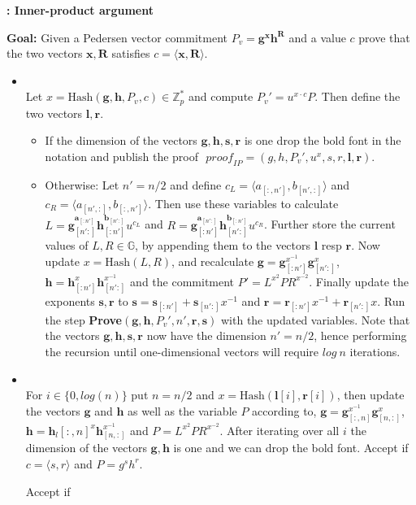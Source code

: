 \begin{algorithm}
\caption{\textbf{: Inner-product argument}}
\textbf{Goal:} Given a Pedersen vector  commitment $P_v=\bm{g}^{\bm{x}} \bm{h}^\bm{R}$ and a value $c$ prove that the two vectors $\bm{x},\bm{R}$ satisfies $c=\langle\bm{x},\bm{R}\rangle$.
\vspace{2pt}
\hline
\vspace{2pt}
\begin{itemize}
\item{}\\
Let $x=\text{Hash}(\mathbf{g},\mathbf{h},P_v,c) \in\mathds{Z}_p^*$ and compute $P_v'= u^{x\cdot c}P$. Then define the two vectors $\mathbf{l},\mathbf{r}$.
\begin{itemize}
    \item If the dimension of the vectors $\mathbf{g},\mathbf{h},\mathbf{s},\mathbf{r}$ is one drop the bold font in the notation and publish the proof $\textit{ proof}_{IP}=(g,h,P_v',u^x,s,r,\mathbf{l},\mathbf{r})$.
    \item  Otherwise:  Let $n'=n/2$ and define  $c_L=\langle a_{[:,n']},b_{[n',:]} \rangle$ and $c_R=\langle a_{[n',:]},b_{[:,n']} \rangle$. Then use these variables to calculate $L=\mathbf{g}_{[n':]}^{\mathbf{a}_{[:n']}} \mathbf{h}_{[:n']}^{\mathbf{b}_{[n':]}} u^{c_L}$ and $R=\mathbf{g}_{[:n']}^{\mathbf{a}_{[n':]}} \mathbf{h}_{[n':]}^{\mathbf{b}_{[:n']}} u^{c_R}$. Further store the current values of $L,R\in\mathds{G}$, by appending them to the vectors $\mathbf{l}$ resp $\mathbf{r}$. Now update $x=\text{Hash}(L,R)$, and recalculate $\mathbf{g} = \mathbf{g}_{[:n']}^{x^{-1}}\mathbf{g}_{[n':]}^{x}$, $\mathbf{h} = \mathbf{h}_{[:n']}^{x}\mathbf{h}_{[n':]}^{x^{-1}}$ and the commitment $P'=L^{x^2}PR^{x^{-2}}$. Finally update the exponents $\mathbf{s},\mathbf{r}$ to $\mathbf{s} = \mathbf{s}_{[:n']}+\mathbf{s}_{[n':]}x^{-1}$ and $\mathbf{r} = \mathbf{r}_{[:n']}x^{-1}+\mathbf{r}_{[n':]}x$. Run the step \textbf{Prove}$(\mathbf{g},\mathbf{h},P_v',n',\mathbf{r},\mathbf{s})$ with the updated variables. Note that the vectors $\mathbf{g},\mathbf{h},\mathbf{s},\mathbf{r}$ now have the dimension $n'=n/2$, hence performing the recursion until one-dimensional vectors will require $log\:n$ iterations.
\end{itemize}
\item{}\\
For $i\in\{0,log(n)\}$ put $n=n/2$ and $x=\text{Hash}(\bm{l}[i],\bm{r}[i])$, then update the vectors $\bm{g}$ and $\bm{h}$ as well as the  variable $P$ according to, $\bm{g}= \bm{g}_{[:,n]}^{x^{-1}}\bm{g}_{[n,:]}^{x}$, $\bm{h}= \bm{h}_l{[:,n]}^{x}\bm{h}_{[n,:]}^{x^{-1}}$ and $ P = L^{x^2}PR^{x^{-2}}  $. After iterating over all $i$ the dimension of the vectors $\bm{g},\bm{h}$ is one and we can drop the bold font. Accept if $c=\langle s,r\rangle$ and $P =g^sh^r$.

Accept if 
\end{itemize}
\label{alg:inner_product}
\end{algorithm}

